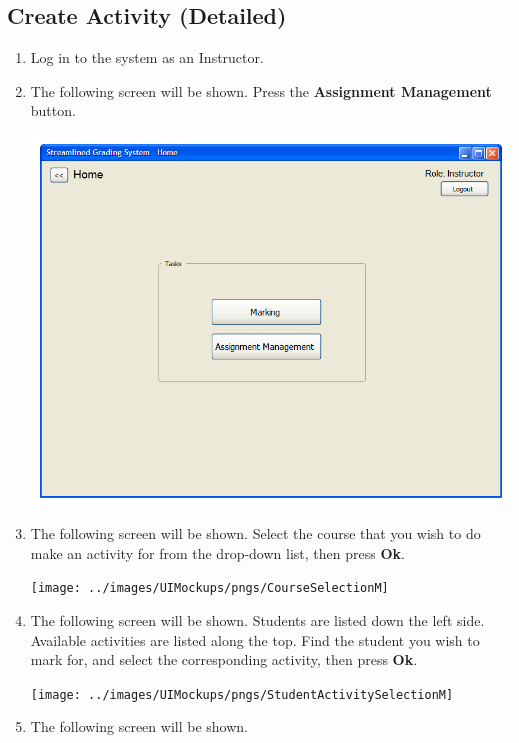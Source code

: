 \documentclass{article}
\begin{document}
\subsection{Create Activity (Detailed)}
\begin{enumerate}
  \item Log in to the system as an Instructor.
  \item The following screen will be shown.
    Press the \textbf{Assignment Management} button.
  \begin{center} 
   \includegraphics[scale=0.55]{../images/UIMockups/pngs/LandingPage}
  \end{center}
  \item The following screen will be shown.  Select the course that you wish
    to do make an activity for from the drop-down list, then press \textbf{Ok}.
    \begin{center} 
      \texttt{[image: ../images/UIMockups/pngs/CourseSelectionM]}
    \end{center}
  \item The following screen will be shown.  Students are listed down the left
    side. Available activities are listed along the top.  Find the student you
    wish to mark for, and select the corresponding activity, then press \textbf{Ok}.
  \begin{center} 
     \texttt{[image: ../images/UIMockups/pngs/StudentActivitySelectionM]}
  \end{center} 
  \item The following screen will be shown.
   \begin{center} 

\end{center}
\end{enumerate}
\end{document}
